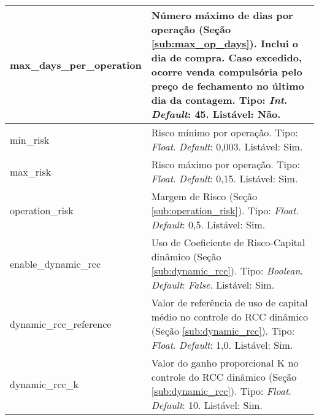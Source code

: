 {\begin{longtable}[m]{| m{11em} | m{21em} |}
    \hline
    max\_days\_per\_operation & Número máximo de dias por operação (Seção \ref{sub:max_op_days}). Inclui o dia de compra. Caso excedido, ocorre venda compulsória pelo preço de fechamento no último dia da contagem. Tipo: \textit{Int}. \textit{Default}: 45. Listável: Não. \\
    \hline
    min\_risk & Risco mínimo por operação. Tipo: \textit{Float}. \textit{Default}: 0,003. Listável: Sim. \\
    \hline
    max\_risk & Risco máximo por operação. Tipo: \textit{Float}. \textit{Default}: 0,15. Listável: Sim. \\
    \hline
    operation\_risk & Margem de Risco (Seção \ref{sub:operation_risk}). Tipo: \textit{Float}. \textit{Default}: 0,5. Listável: Sim. \\
    \hline
    enable\_dynamic\_rcc & Uso de Coeficiente de Risco-Capital dinâmico (Seção \ref{sub:dynamic_rcc}). Tipo: \textit{Boolean}. \textit{Default}: \textit{False}. Listável: Sim. \\
    \hline
    dynamic\_rcc\_reference & Valor de referência de uso de capital médio no controle do RCC dinâmico (Seção \ref{sub:dynamic_rcc}). Tipo: \textit{Float}. \textit{Default}: 1,0. Listável: Sim. \\
    \hline
    dynamic\_rcc\_k & Valor do ganho proporcional K no controle do RCC dinâmico (Seção \ref{sub:dynamic_rcc}). Tipo: \textit{Float}. \textit{Default}: 10. Listável: Sim. \\
    \hline


\end{longtable}}
